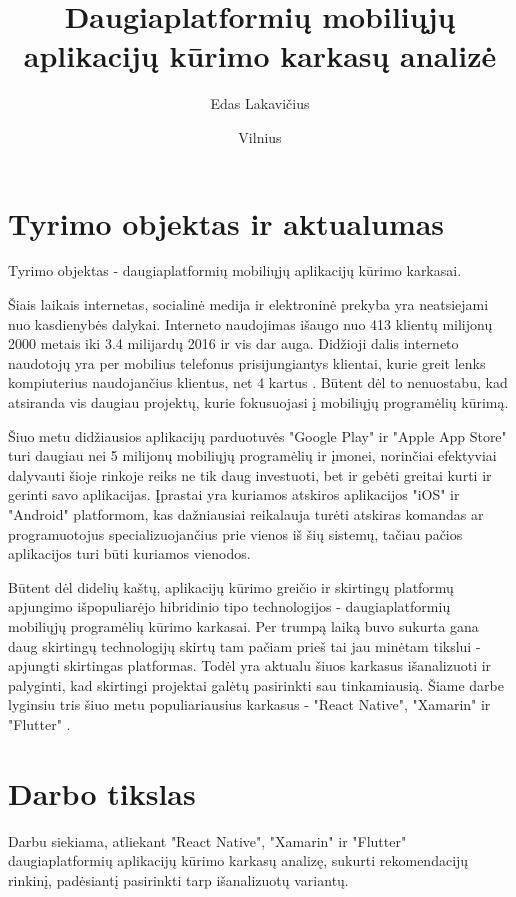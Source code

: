 \documentclass{VUMIFInfBakalaurinis}
\title{Daugiaplatformių mobiliųjų aplikacijų kūrimo karkasų analizė}
\author{Edas Lakavičius}
\date{Vilnius \\ \the\year}
\begin{document}
\maketitle

\tableofcontents

\section{Tyrimo objektas ir aktualumas}
Tyrimo objektas - daugiaplatformių mobiliųjų aplikacijų kūrimo karkasai.

Šiais laikais internetas, socialinė medija ir elektroninė prekyba yra neatsiejami nuo kasdienybės dalykai. Interneto naudojimas išaugo nuo 413 klientų milijonų 2000 metais iki 3.4 milijardų 2016 \cite{owidinternet} ir vis dar auga. Didžioji dalis interneto naudotojų yra per mobilius telefonus prisijungiantys klientai, kurie greit lenks kompiuterius naudojančius klientus, net 4 kartus \cite{internetusage}. Būtent dėl to nenuostabu, kad atsiranda vis daugiau projektų, kurie fokusuojasi į mobiliųjų programėlių kūrimą.

Šiuo metu didžiausios aplikacijų parduotuvės "Google Play" ir "Apple App Store" turi daugiau nei 5 milijonų mobiliųjų programėlių \cite{appcount} ir įmonei, norinčiai efektyviai dalyvauti šioje rinkoje reiks ne tik daug investuoti, bet ir gebėti greitai kurti ir gerinti savo aplikacijas. Įprastai yra kuriamos atskiros aplikacijos "iOS" ir "Android" platformom, kas dažniausiai reikalauja turėti atskiras komandas ar programuotojus specializuojančius prie vienos iš šių sistemų, tačiau pačios aplikacijos turi būti kuriamos vienodos.

Būtent dėl didelių kaštų, aplikacijų kūrimo greičio ir skirtingų platformų apjungimo išpopuliarėjo hibridinio tipo technologijos - daugiaplatformių mobiliųjų programėlių kūrimo karkasai. Per trumpą laiką buvo sukurta gana daug skirtingų technologijų skirtų tam pačiam prieš tai jau minėtam tikslui - apjungti skirtingas platformas. Todėl yra aktualu šiuos karkasus išanalizuoti ir palyginti, kad skirtingi projektai galėtų pasirinkti sau tinkamiausią. Šiame darbe lyginsiu tris šiuo metu populiariausius karkasus - "React Native", "Xamarin" ir "Flutter" \cite{popularframeworks}.

\section{Darbo tikslas}
Darbu siekiama, atliekant "React Native", "Xamarin" ir "Flutter" daugiaplatformių aplikacijų kūrimo karkasų analizę, sukurti rekomendacijų rinkinį, padėsiantį pasirinkti tarp išanalizuotų variantų.
\end{document}
